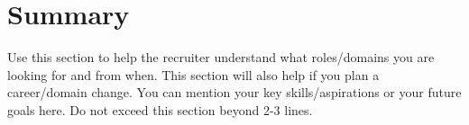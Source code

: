 \section{Summary}
    \begin{itemize}[leftmargin=0.15in, label={}]
	\small{\item{
		{Use this section to help the recruiter understand what roles/domains you are looking for and from when. This section will also help if you plan a career/domain change. You can mention your key skills/aspirations or your future goals here. Do not exceed this section beyond 2-3 lines.}
	}}
    \end{itemize}